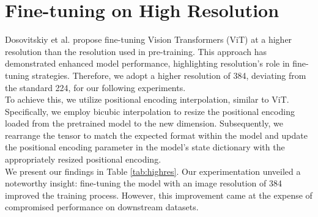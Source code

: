 \section{Fine-tuning on High Resolution}
Dosovitskiy et al. propose fine-tuning Vision Transformers (ViT) at a higher resolution than the resolution used in pre-training\cite{dosovitskiy2020image}. This approach has demonstrated enhanced model performance, highlighting resolution's role in fine-tuning strategies. Therefore, we adopt a higher resolution of 384, deviating from the standard 224, for our following experiments.\\
To achieve this, we utilize positional encoding interpolation, similar to ViT\cite{dosovitskiy2020image}. Specifically, we employ bicubic interpolation to resize the positional encoding loaded from the pretrained model to the new dimension. Subsequently, we rearrange the tensor to match the expected format within the model and update the positional encoding parameter in the model's state dictionary with the appropriately resized positional encoding.\\ 
We present our findings in Table \ref{tab:highres}.
Our experimentation unveiled a noteworthy insight: fine-tuning the model with an image resolution of 384 improved the training process. However, this improvement came at the expense of compromised performance on downstream datasets.
